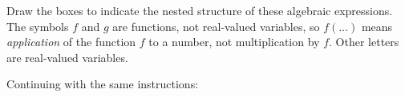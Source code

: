 
Draw the boxes to indicate the nested structure of these algebraic expressions.
The symbols $f$ and $g$ are functions, not real-valued variables, so $f(\dots)$ means \emph{application} of the function $f$ to a number, not multiplication by $f$.
Other letters are real-valued variables.
\bigskip

\begin{multicols}{2}
 \begin{ProblemSet}[pencil space=1in]
 \end{ProblemSet}
\end{multicols}

\newpage
{}

Continuing with the same instructions:

\begin{multicols}{2}
 \begin{ProblemSet}[continue,pencil space=0.75in]
 \end{ProblemSet}
\end{multicols}


